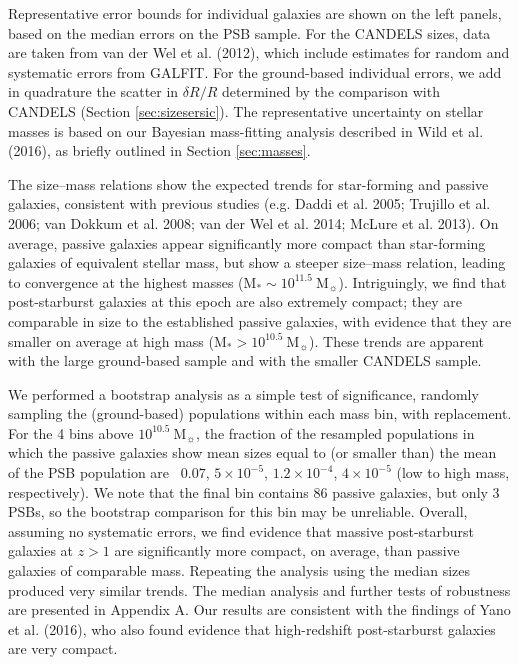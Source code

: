 \documentclass[a4paper,fleqn,usenatbib,useAMS]{mnras}
\begin{document}
Representative error bounds for individual galaxies are shown on the
left panels, based on the median errors on the PSB sample. For the
CANDELS sizes, data are taken from van der Wel et al. (2012), which
include estimates for random and systematic errors from GALFIT. For
the ground-based individual errors, we add in quadrature the scatter
in $\delta R/R$ determined by the comparison with CANDELS (Section
\ref{sec:sizesersic}).  The representative uncertainty on stellar
masses is based on our Bayesian mass-fitting analysis described in
Wild et al. (2016), as briefly outlined in Section \ref{sec:masses}.


The size--mass relations show the expected trends for star-forming and
passive galaxies, consistent with previous studies (e.g. Daddi et
al. 2005; Trujillo et al. 2006; van Dokkum et al. 2008; van der Wel et
al. 2014; McLure et al. 2013).  On average, passive galaxies appear
significantly more compact than star-forming galaxies of equivalent
stellar mass, but show a steeper size--mass relation, leading to
convergence at the highest masses (M$_{\ast} \sim 10^{11.5}
~$M$_{\sun}$). Intriguingly, we find that post-starburst galaxies at
this epoch are also extremely compact; they are comparable in size to
the established passive galaxies, with evidence that they are smaller
on average at high mass (M$_{\ast}> 10^{10.5} ~$M$_{\sun}$).  These
trends are apparent with the large ground-based sample and with the
smaller CANDELS sample.


We performed a bootstrap analysis as a simple test of significance,
randomly sampling the (ground-based) populations within each mass bin,
with replacement.  For the 4 bins above $10^{10.5} ~$M$_{\sun}$, the
fraction of the resampled populations in which the passive galaxies
show mean sizes equal to (or smaller than) the mean of the PSB
population are ~$0.07$, $5\times10^{-5}$, $1.2\times 10^{-4}$,
$4\times10^{-5}$ (low to high mass, respectively).  We note that the
final bin contains 86 passive galaxies, but only 3 PSBs, so the
bootstrap comparison for this bin may be unreliable.  Overall,
assuming no systematic errors, we find evidence that massive
post-starburst galaxies at $z>1$ are significantly more compact, on
average, than passive galaxies of comparable mass.  Repeating the
analysis using the median sizes produced very similar trends. The
median analysis and further tests of robustness are presented in
Appendix A.  Our results are consistent with the findings of Yano et
al. (2016), who also found evidence that high-redshift post-starburst
galaxies are very compact.
\end{document}
